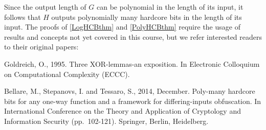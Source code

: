 Since the output length of \(G\) can be polynomial in the length of its
input, it follows that \(H\) outputs polynomially many hardcore bits in
the length of its input. The proofs of \cref{LogHCBthm} and
\cref{PolyHCBthm} require the usage of results and concepts not yet
covered in this course, but we refer interested readers to their
original papers:

Goldreich, O., 1995. Three XOR-lemmas-an exposition. In Electronic
Colloquium on Computational Complexity (ECCC).

Bellare, M., Stepanovs, I. and Tessaro, S., 2014, December. Poly-many
hardcore bits for any one-way function and a framework for
differing-inputs obfuscation. In International Conference on the Theory
and Application of Cryptology and Information Security (pp.~102-121).
Springer, Berlin, Heidelberg.
